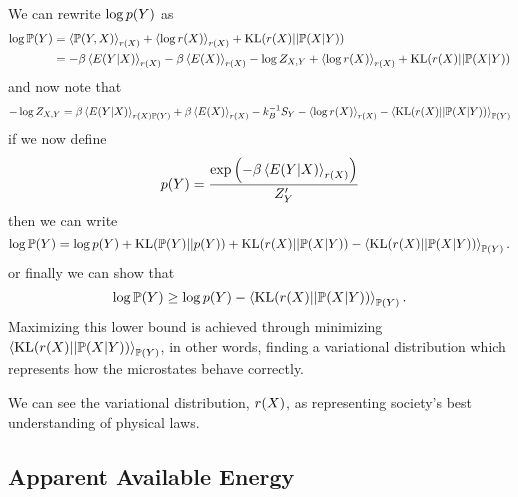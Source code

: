 \documentclass[]{article}
\begin{document}
We can rewrite $\log p(Y)$ as
\begin{align*}
    \log \mathbb{P}(Y) & = \left\langle \mathbb{P}(Y, X) \right\rangle_{r(X )} +  \left\langle \log r(X) \right\rangle_{r(X)} +  \text{KL}(r(X)||\mathbb{P}(X|Y))\\
    & = -\beta\left\langle  E(Y | X) \right\rangle_{r(X)}  -\beta\left\langle E(X) \right\rangle_{r(X)} - \log Z_{X,Y} + \left\langle \log r(X) \right\rangle_{r(X)} +  \text{KL}(r(X)||\mathbb{P}(X|Y))
\end{align*}
and now note that
\[
-  \log Z_{X,Y} = \beta\left\langle E(Y | X) \right\rangle_{r(X)\mathbb{P}(Y)} + \beta\left\langle E(X) \right\rangle_{r(X )} - k_B^{-1}S_Y -\left\langle \log r(X) \right\rangle_{r(X)} - \left\langle \text{KL}(r(X) || \mathbb{P}(X | Y)) \right\rangle_{\mathbb{P}(Y)}
\]
if we now define
\[
p(Y) = \frac{\exp\left(-\beta \left\langle E(Y | X) \right\rangle_{r(X)}\right)}{Z^\prime_Y}
\]
then we can write
\[
\log \mathbb{P}(Y) = \log p(Y)  + \text{KL}(\mathbb{P}(Y)||p(Y))  + \text{KL}(r(X)||\mathbb{P}(X|Y)) - \left\langle \text{KL}(r(X)||\mathbb{P}(X|Y)) \right\rangle_{\mathbb{P}(Y)}. 
\]
or finally we can show that
\[
\log \mathbb{P}(Y) \geq \log p(Y) - \left\langle \text{KL}(r(X)||\mathbb{P}(X|Y)) \right\rangle_{\mathbb{P}(Y)}.
\]
Maximizing this lower bound is achieved through minimizing $\left\langle \text{KL}(r(X)||\mathbb{P}(X|Y)) \right\rangle_{\mathbb{P}(Y)}$, in other words, finding a variational distribution which represents how the microstates behave correctly. 

We can see the variational distribution, $r(X)$, as representing society's best understanding of physical laws. 

\subsection{Apparent Available Energy}
\end{document}
